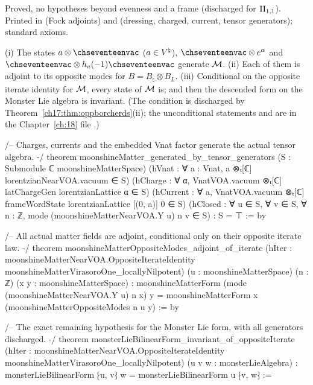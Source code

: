 \begin{status}
Proved, no hypotheses beyond evenness and a frame (discharged for ${\mathrm{II}_{1,1}}$).  Printed in
 (Fock adjoints) and 
(dressing, charged, current, tensor generators); standard axioms.
\end{status}

\begin{theorem}\label{ch17:thm:matterfhl}
(i) The states $a\otimes\chseventeenvac$ ($a\in{V^{\natural}}$), $\chseventeenvac\otimes e^\alpha$ and $\chseventeenvac\otimes h_a(-1)\chseventeenvac$ generate $\mathcal{M}$.
(ii) Each of them is adjoint to its opposite modes for $B=B_\natural\otimes B_L$.
(iii) Conditional on the opposite iterate identity for $\mathcal{M}$, every state of $\mathcal{M}$ is; and then the descended form
on the Monster Lie algebra is invariant.  (The condition is discharged by Theorem~\ref{ch17:thm:oppborcherds}(ii); the
unconditional statements  and  are in the
Chapter~\ref{ch:18} file .)
\end{theorem}

\begin{leancode}
/-- Charges, currents and the embedded Vnat factor generate the actual tensor algebra. -/
theorem moonshineMatter_generated_by_tensor_generators (S : Submodule ℂ moonshineMatterSpace)
    (hVnat : ∀ a : Vnat, a ⊗ₜ[ℂ] lorentzianNearVOA.vacuum ∈ S)
    (hCharge : ∀ α, VnatVOA.vacuum ⊗ₜ[ℂ] latChargeGen lorentzianLattice α ∈ S)
    (hCurrent : ∀ a, VnatVOA.vacuum ⊗ₜ[ℂ]
      frameWordState lorentzianLattice [(0, a)] 0 ∈ S)
    (hClosed : ∀ u ∈ S, ∀ v ∈ S, ∀ n : ℤ,
      mode (moonshineMatterNearVOA.Y u) n v ∈ S) : S = ⊤ := by

/-- All actual matter fields are adjoint, conditional only on their opposite iterate law. -/
theorem moonshineMatterOppositeModes_adjoint_of_iterate
    (hIter : moonshineMatterNearVOA.OppositeIterateIdentity
      moonshineMatterVirasoroOne_locallyNilpotent)
    (u : moonshineMatterSpace) (n : ℤ) (x y : moonshineMatterSpace) :
    moonshineMatterForm (mode (moonshineMatterNearVOA.Y u) n x) y =
      moonshineMatterForm x (moonshineMatterOppositeModes n u y) := by

/-- The exact remaining hypothesis for the Monster Lie form, with all generators discharged. -/
theorem monsterLieBilinearForm_invariant_of_oppositeIterate
    (hIter : moonshineMatterNearVOA.OppositeIterateIdentity
      moonshineMatterVirasoroOne_locallyNilpotent)
    (u v w : monsterLieAlgebra) :
    monsterLieBilinearForm ⁅u, v⁆ w = monsterLieBilinearForm u ⁅v, w⁆ :=
\end{leancode}

